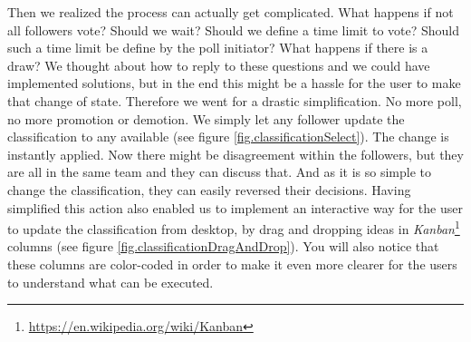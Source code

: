\documentclass[a4paper,12pt, oneside]{article}
\begin{document}
Then we realized the process can actually get complicated.
What happens if not all followers vote?
Should we wait?
Should we define a time limit to vote? Should such a time limit be define by the poll initiator?
What happens if there is a draw?
We thought about how to reply to these questions and we could have implemented solutions, but in the end this might be a hassle for the user to make that change of state.
Therefore we went for a drastic simplification.
No more poll, no more promotion or demotion.
We simply let any follower update the classification to any available (see figure \ref{fig.classificationSelect}).
The change is instantly applied.
Now there might be disagreement within the followers, but they are all in the same team and they can discuss that.
And as it is so simple to change the classification, they can easily reversed their decisions.
Having simplified this action also enabled us to implement an interactive way for the user to update the classification from desktop, by drag and dropping ideas in \emph{Kanban}\footnote{\url{https://en.wikipedia.org/wiki/Kanban}} columns (see figure \ref{fig.classificationDragAndDrop}).
You will also notice that these columns are color-coded in order to make it even more clearer for the users to understand what can be executed.
\end{document}
